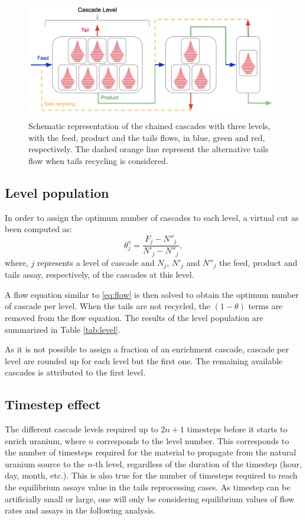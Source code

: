 \begin{figure}[ht] %
    \centering
    \includegraphics[scale=0.45]{flow}
    \caption{Schematic representation of the chained cascades with three levels,
    with the feed, product and the tails flows, in blue, green and red,
    respectively. The dashed orange line represent the alternative tails flow when
    tails recycling is considered.}
    \label{fig:cascade_level}
\end{figure}


\subsection{Level population}
In order to assign the optimum number of cascades to each level, a virtual cut as
been computed as:
\begin{equation}
    \theta^{v}_{j} = \frac{F_{j}-N''_{j}}{N'_{j}-N''_{j}},
\end{equation}
where, $j$ represents a level of cascade and $N_{j}$, $N'_{j}$ and $N''_{j}$
the feed, product and tails assay, respectively, of the cascades at this level.

A flow equation similar to \eqref{eq:flow} is then solved to obtain the optimum
number of cascade per level. When the tails are not recycled, the $(1-\theta)$
terms are removed from the flow equation.  The results of the level population
are summarized in Table \ref{tab:level}.

As it is not possible to assign a fraction of an enrichment cascade, cascade per
level are rounded up for each level but the first one. The remaining available
cascades is attributed to the first level.


\subsection{Timestep effect}

The different cascade levels required up to $2n+1$ timesteps
before it starts to enrich uranium, where $n$ corresponds to the level number.
This corresponds to the number of timesteps required for the material to
propagate from the natural uranium source to the $n$-th level, regardless of the
duration of the timestep (hour, day, month, etc.). This is also true for the
number of timesteps required to reach the equilibrium assays value in the tails
reprocessing cases.  As timestep can be artificially small or large, one will
only be considering equilibrium values of flow rates and assays in the following
analysis.

